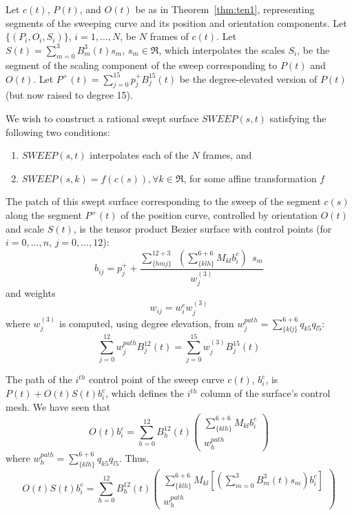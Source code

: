 \begin{theorem}
\label{thm:ten2}
Let $c(t)$, $P(t)$, and $O(t)$ be as in Theorem~\ref{thm:ten1},
representing segments of the sweeping curve and its position and orientation components.
Let $\{(P_i,O_i,S_i)\}$, $i=1,\ldots,N$, be $N$ frames of $c(t)$.
Let $S(t) = \sum_{m=0}^{3} B_m^3(t) s_m$, $s_m \in \Re$, which interpolates 
the scales $S_i$, be the segment of the scaling component of the sweep 
corresponding to $P(t)$ and $O(t)$.
Let $P^{+}(t) = \sum_{j=0}^{15} p_j^{+} B_j^{15}(t)$
be the degree-elevated version of $P(t)$ (but now raised to degree 15).

We wish to construct a rational swept surface $SWEEP(s,t)$ satisfying 
the following two conditions:
\begin{enumerate}
\item $SWEEP(s,t)$ interpolates each of the $N$ frames, and
\item $SWEEP(s,k) = f(c(s)), \forall k \in \Re$, for some affine transformation $f$
\end{enumerate}
The patch of this swept surface corresponding to the sweep of the segment
$c(s)$ along the segment $P^{+}(t)$ of the position curve, controlled 
by orientation $O(t)$ and scale $S(t)$, 
is the tensor product Bezier surface with control points
(for $i=0,\ldots,n$, $j=0,\ldots,12$):
\[
b_{ij} = p_j^{+} + \frac{\sum_{\{hmj\}}^{12+3} \ \ 
		(\sum_{\{klh\}}^{6+6} M_{kl} b_i^c) \ \ s_m}{w^{(3)}_j}
\]
and weights
\[
w_{ij} = w_i^c  w^{(3)}_j
\]
where $w^{(3)}_j$ is computed, using degree elevation, from 
$w_j^{path} = \sum_{\{klj\}}^{6+6} q_{k5} q_{l5}$:
\[ \sum_{j=0}^{12} w_j^{path} B_j^{12}(t) = 
   \sum_{j=0}^{15} w_j^{(3)}  B_j^{15}(t) \]
\end{theorem}
\prf
The path of the $i^{th}$ control point of the sweep curve $c(t)$,
$b_i^c$, is $P(t) + O(t)S(t)b_i^c$,
which defines the $i^{th}$ column of the surface's control mesh.
We have seen that 
\[
O(t) b_i^c = 	\sum_{h=0}^{12} B_h^{12}(t) 
	\left(	\begin{array}{c}
	\sum_{\{klh\}}^{6+6} M_{kl} b_i^c \\ w_h^{path}
	\end{array} \right)
\]
where $w_h^{path} = \sum_{\{klh\}}^{6+6} q_{k5} q_{l5}$.
Thus,
\[
O(t)S(t)b_i^c = 
	\sum_{h=0}^{12} B_h^{12}(t) 
	\left(	\begin{array}{c}
	\sum_{\{klh\}}^{6+6} M_{kl} [(\sum_{m=0}^3 B_m^3(t) s_m) b_i^c] \\
	w_h^{path}
	\end{array} \right)
\]
